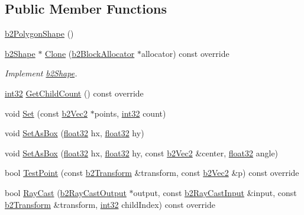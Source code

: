 \subsection*{Public Member Functions}
\begin{DoxyCompactItemize}
\item 
\mbox{\hyperlink{classb2_polygon_shape_a76d778e6b374e4d22167a609dc0333a4}{b2\+Polygon\+Shape}} ()
\item 
\mbox{\hyperlink{classb2_shape}{b2\+Shape}} $\ast$ \mbox{\hyperlink{classb2_polygon_shape_ae2c2343be33db465f7e83db2061fdd51}{Clone}} (\mbox{\hyperlink{classb2_block_allocator}{b2\+Block\+Allocator}} $\ast$allocator) const override
\begin{DoxyCompactList}\small\item\em Implement \mbox{\hyperlink{classb2_shape}{b2\+Shape}}. \end{DoxyCompactList}\item 
\mbox{\hyperlink{b2_settings_8h_a43d43196463bde49cb067f5c20ab8481}{int32}} \mbox{\hyperlink{classb2_polygon_shape_aa8bb0d5a88624104425cdee0b2f4427a}{Get\+Child\+Count}} () const override
\item 
void \mbox{\hyperlink{classb2_polygon_shape_a4d7b35550509f570814b97325a68966b}{Set}} (const \mbox{\hyperlink{structb2_vec2}{b2\+Vec2}} $\ast$points, \mbox{\hyperlink{b2_settings_8h_a43d43196463bde49cb067f5c20ab8481}{int32}} count)
\item 
void \mbox{\hyperlink{classb2_polygon_shape_a6bb90df8b4a40d1c53b64cc352a855dd}{Set\+As\+Box}} (\mbox{\hyperlink{b2_settings_8h_aacdc525d6f7bddb3ae95d5c311bd06a1}{float32}} hx, \mbox{\hyperlink{b2_settings_8h_aacdc525d6f7bddb3ae95d5c311bd06a1}{float32}} hy)
\item 
void \mbox{\hyperlink{classb2_polygon_shape_a890690250115483da6c7d69829be087e}{Set\+As\+Box}} (\mbox{\hyperlink{b2_settings_8h_aacdc525d6f7bddb3ae95d5c311bd06a1}{float32}} hx, \mbox{\hyperlink{b2_settings_8h_aacdc525d6f7bddb3ae95d5c311bd06a1}{float32}} hy, const \mbox{\hyperlink{structb2_vec2}{b2\+Vec2}} \&center, \mbox{\hyperlink{b2_settings_8h_aacdc525d6f7bddb3ae95d5c311bd06a1}{float32}} angle)
\item 
bool \mbox{\hyperlink{classb2_polygon_shape_a129c4ac76727fe02724f675e3fef7fe5}{Test\+Point}} (const \mbox{\hyperlink{structb2_transform}{b2\+Transform}} \&transform, const \mbox{\hyperlink{structb2_vec2}{b2\+Vec2}} \&p) const override
\item 
bool \mbox{\hyperlink{classb2_polygon_shape_a41f20072763688f1745f12f67f40e904}{Ray\+Cast}} (\mbox{\hyperlink{structb2_ray_cast_output}{b2\+Ray\+Cast\+Output}} $\ast$output, const \mbox{\hyperlink{structb2_ray_cast_input}{b2\+Ray\+Cast\+Input}} \&input, const \mbox{\hyperlink{structb2_transform}{b2\+Transform}} \&transform, \mbox{\hyperlink{b2_settings_8h_a43d43196463bde49cb067f5c20ab8481}{int32}} child\+Index) const override

\end{DoxyCompactItemize}
